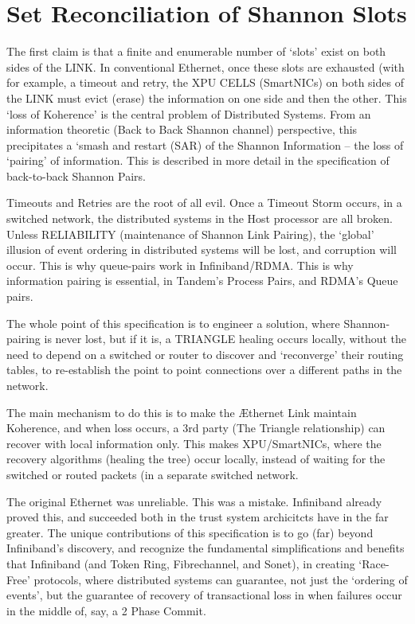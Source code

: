 \documentclass[../../../OAE-SPEC-MAIN.tex]{subfiles}
\begin{document}
\section{Set Reconciliation of Shannon Slots}

The first claim is that a finite and enumerable number of  `slots' exist on both sides of the LINK. In conventional Ethernet, once these slots are exhausted (with for example, a timeout and retry, the XPU CELLS (SmartNICs) on both sides of the LINK must evict (erase) the information on one side and then the other. This `loss of Koherence' is the central problem of Distributed Systems.  From an information theoretic (Back to Back Shannon channel) perspective, this precipitates a `smash and restart (SAR) of the Shannon Information --  the loss of `pairing' of information. This is described in more detail in the specification of back-to-back Shannon Pairs.

Timeouts and Retries are the root of all evil.  Once a Timeout Storm occurs, in a switched network, the distributed systems in the Host processor are all broken. Unless RELIABILITY (maintenance of Shannon Link Pairing),  the `global' illusion of event ordering in distributed systems will be lost, and corruption will occur.  This is why queue-pairs work in Infiniband/RDMA. This is why information pairing is essential, in Tandem's Process Pairs, and RDMA's Queue pairs.

The whole point of this specification is to engineer a solution, where Shannon-pairing is never lost, but if it is, a TRIANGLE healing occurs locally, without the need to depend on a switched or router to discover and  `reconverge' their routing tables, to re-establish the point to point connections over a different paths in the network.  

The main mechanism to do this is to make the Æthernet Link maintain Koherence, and when loss occurs, a 3rd party (The Triangle relationship) can recover with local information only. This makes XPU/SmartNICs, where the recovery algorithms (healing the tree) occur locally, instead of waiting for the switched or routed packets (in a separate switched network.

The original Ethernet was unreliable. This was a mistake. Infiniband already proved this, and succeeded both in the trust system archicitcts have in the far greater. The unique contributions of this specification is to go (far) beyond Infiniband's discovery, and recognize the fundamental simplifications and benefits that Infiniband (and Token Ring,  Fibrechannel, and Sonet), in creating `Race-Free' protocols, where distributed systems can guarantee, not just the `ordering of events', but the guarantee of recovery of transactional loss in when failures occur in the middle of, say, a 2 Phase Commit. 
\end{document}
